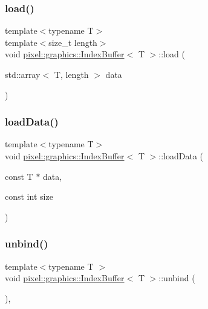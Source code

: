 \subsubsection{\texorpdfstring{load()}{load()}}
{\footnotesize\ttfamily template$<$typename T$>$ \\
template$<$size\+\_\+t length$>$ \\
void \hyperlink{classpixel_1_1graphics_1_1_index_buffer}{pixel\+::graphics\+::\+Index\+Buffer}$<$ T $>$\+::load (\begin{DoxyParamCaption}\item[{std\+::array$<$ T, length $>$}]{data }\end{DoxyParamCaption})}

\mbox{\label{classpixel_1_1graphics_1_1_index_buffer_aef55496774e132eb2deac595165e3576}} 
\subsubsection{\texorpdfstring{load\+Data()}{loadData()}}
{\footnotesize\ttfamily template$<$typename T$>$ \\
void \hyperlink{classpixel_1_1graphics_1_1_index_buffer}{pixel\+::graphics\+::\+Index\+Buffer}$<$ T $>$\+::load\+Data (\begin{DoxyParamCaption}\item[{const T $\ast$}]{data,  }\item[{const int}]{size }\end{DoxyParamCaption})}

\mbox{\label{classpixel_1_1graphics_1_1_index_buffer_a5a90a44db73a048c76cf0fade5867621}} 
\subsubsection{\texorpdfstring{unbind()}{unbind()}}
{\footnotesize\ttfamily template$<$typename T $>$ \\
void \hyperlink{classpixel_1_1graphics_1_1_index_buffer}{pixel\+::graphics\+::\+Index\+Buffer}$<$ T $>$\+::unbind (\begin{DoxyParamCaption}{ }\end{DoxyParamCaption})\hspace{0.3cm}{\ttfamily [override]}, {\ttfamily [virtual]}}



